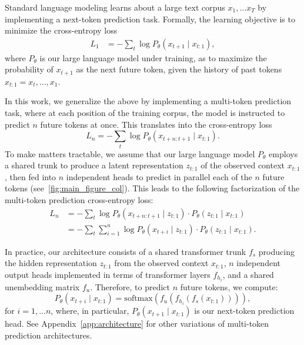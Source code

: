 \label{sect:method}
Standard language modeling learns about a large text corpus $x_1, \ldots x_T$ by implementing a next-token prediction task.
Formally, the learning objective is to minimize the cross-entropy loss
\begin{align}
     L_1
     &= - \sum_t \log P_\theta(x_{t+1} \mid x_{t:1}),
\end{align}
where $P_\theta$ is our large language model under training, as to maximize the probability of $x_{t+1}$ as the next future token, given the history of past tokens $x_{t:1} = x_{t}, \ldots, x_{1}$.

In this work, we generalize the above by implementing a multi-token prediction task, where at each position of the training corpus, the model is instructed to predict $n$ future tokens at once.
This translates into the cross-entropy loss
\begin{equation}
    L_n = - \sum_t \log P_\theta(x_{t+n:t+1} \mid x_{t:1}).
\end{equation}
To make matters tractable, we assume that our large language model $P_\theta$ employs a shared trunk to produce a latent representation $z_{t:1}$ of the observed context $x_{t:1}$, then fed into $n$ independent heads to predict in parallel each of the $n$ future tokens (see~\cref{fig:main_figure_col}).
This leads to the following factorization of the multi-token prediction cross-entropy loss:
\begin{align*} \label{eq:loss-n}
    L_n
    &= - \sum_t \log P_\theta(x_{t+n:t+1} \mid z_{t:1}) \cdot P_\theta(z_{t:1} \mid x_{t:1}) \\
    &= - \sum_t \sum_{i=1}^{n} \log P_\theta(x_{t+i} \mid z_{t:1}) \cdot P_\theta(z_{t:1} \mid x_{t:1}).
\end{align*}

In practice, our architecture consists of a shared transformer trunk $f_s$ producing the hidden representation $z_{t:1}$ from the observed context $x_{t:1}$, $n$ independent output heads implemented in terms of transformer layers $f_{h_i}$, and a shared unembedding matrix $f_u$.
Therefore, to predict $n$ future tokens, we compute:
$$P_\theta(x_{t+i} \mid x_{t:1}) = \text{softmax}(f_u(f_{h_i}(f_s(x_{t:1})))),$$
for $i=1,\ldots n$, where, in particular, $P_\theta(x_{t+1} \mid x_{t:1})$ is our next-token prediction head.
See Appendix~\ref{app:architecture} for other variations of multi-token prediction architectures.













